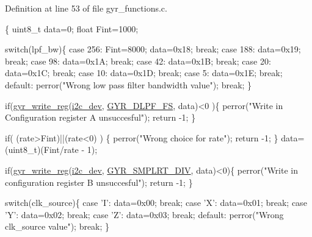 Definition at line 53 of file gyr\-\_\-functions.\-c.


\begin{DoxyCode}
\{ 
  uint8\_t data=0;
  \textcolor{keywordtype}{float} Fint=1000;

  \textcolor{keywordflow}{switch}(lpf\_bw)\{
    \textcolor{keywordflow}{case} 256:
      Fint=8000;
      data=0x18;
      \textcolor{keywordflow}{break};
    \textcolor{keywordflow}{case} 188:
      data=0x19;
      \textcolor{keywordflow}{break};
    \textcolor{keywordflow}{case} 98:
      data=0x1A;
      \textcolor{keywordflow}{break};
    \textcolor{keywordflow}{case} 42:
      data=0x1B;
      \textcolor{keywordflow}{break};
    \textcolor{keywordflow}{case} 20:
      data=0x1C;
      \textcolor{keywordflow}{break};
    \textcolor{keywordflow}{case} 10:
      data=0x1D;
      \textcolor{keywordflow}{break};
    \textcolor{keywordflow}{case} 5:
      data=0x1E;
      \textcolor{keywordflow}{break};
    \textcolor{keywordflow}{default}:
      perror(\textcolor{stringliteral}{"Wrong low pass filter bandwidth value"});
      \textcolor{keywordflow}{break};
  \}
  
  \textcolor{keywordflow}{if}(\hyperlink{group__gyr_ga3eba167b8ab0614bfe7bafeae8b5570d}{gyr\_write\_reg}(\hyperlink{CommunicationV0_2communication_8c_a7751bd45ac1064efb35adf1f19c25db8}{i2c\_dev}, \hyperlink{communication_2imu__regs_8h_a78908b66de8b46d12895e7cb66af6f5c}{GYR\_DLPF\_FS}, data)<0
      )\{
    perror(\textcolor{stringliteral}{"Write in Configuration register A unsuccesful"});
    \textcolor{keywordflow}{return} -1;
  \}

  \textcolor{keywordflow}{if}( (rate>Fint)||(rate<0) )
  \{
    perror(\textcolor{stringliteral}{"Wrong choice for rate"});
    \textcolor{keywordflow}{return} -1;
  \}
  data=(uint8\_t)(Fint/rate - 1);
  
  \textcolor{keywordflow}{if}(\hyperlink{group__gyr_ga3eba167b8ab0614bfe7bafeae8b5570d}{gyr\_write\_reg}(\hyperlink{CommunicationV0_2communication_8c_a7751bd45ac1064efb35adf1f19c25db8}{i2c\_dev}, \hyperlink{communication_2imu__regs_8h_a04a18568e6e39825c98be5ec2976bec4}{GYR\_SMPLRT\_DIV}, 
      data)<0)\{
    perror(\textcolor{stringliteral}{"Write in configuration register B unsuccesful"});
    \textcolor{keywordflow}{return} -1;
  \}
      
  \textcolor{keywordflow}{switch}(clk\_source)\{
    \textcolor{keywordflow}{case} \textcolor{charliteral}{'I'}:
      data=0x00;
      \textcolor{keywordflow}{break};
    \textcolor{keywordflow}{case} \textcolor{charliteral}{'X'}:
      data=0x01;
      \textcolor{keywordflow}{break};
    \textcolor{keywordflow}{case} \textcolor{charliteral}{'Y'}:
      data=0x02;
      \textcolor{keywordflow}{break};
    \textcolor{keywordflow}{case} \textcolor{charliteral}{'Z'}:
      data=0x03;
      \textcolor{keywordflow}{break};
    \textcolor{keywordflow}{default}:
      perror(\textcolor{stringliteral}{"Wrong clk\_source value"});
      \textcolor{keywordflow}{break};
  \}
      

\end{DoxyCode}
